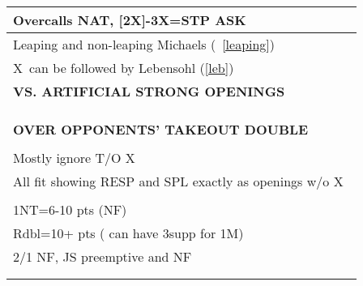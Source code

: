 \documentclass{article}
\newcommand\X{{\footnotesize X}}
\begin{document}
{\begin{minipage}{90mm}
\begin{tabular}{| p{88mm} |}
                Overcalls NAT, [2X]-3X=STP ASK
		\\ \hline
                Leaping and non-leaping Michaels (~\ref{leaping})
		\\ \hline
                \X\ can be followed by Lebensohl (\ref{leb})
		\\ \hline
		\textbf{VS. ARTIFICIAL STRONG OPENINGS} \\ \hline
		\\ \hline
		\\ \hline
		\\ \hline
		\textbf{OVER OPPONENTS' TAKEOUT DOUBLE} \\ \hline
		\\ \hline
                Mostly ignore T/O \X\
		\\ \hline
                All fit showing RESP and SPL
                exactly as openings w/o \X\
		\\ \hline
		\\ \hline
                1NT=6-10 pts (NF)
		\\ \hline
                Rdbl=10+ pts ( can have 3supp for 1M)
		\\ \hline
                2/1 NF, JS preemptive and  NF
		\\ \hline
		\\ \hline
		\\ \hline
	\end{tabular}
\end{minipage}
}
\begin{minipage}{5mm}
	\begin{tabular}{| p{5mm} |}
	\end{tabular}
\end{minipage}
\end{document}
